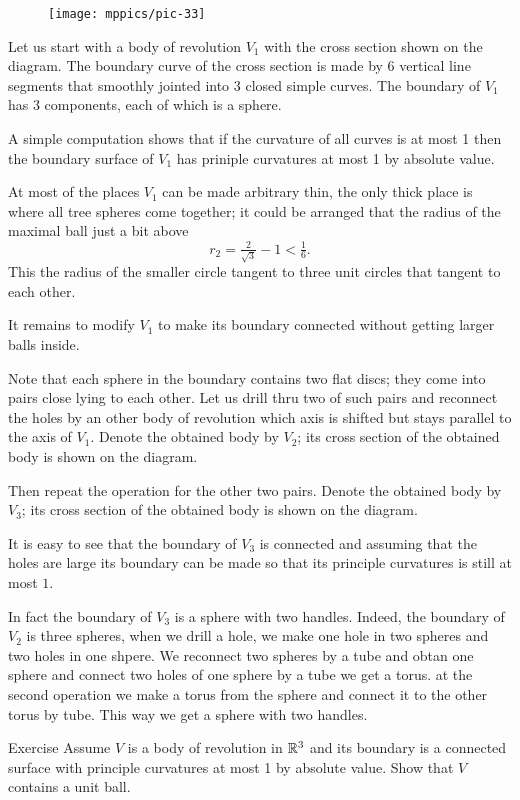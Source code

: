 \begin{figure}%
\centering
\texttt{[image: mppics/pic-33]}
\vskip0mm
\end{figure}

Let us start with a body of revolution $V_1$ with the cross section shown on the diagram.
The boundary curve of the cross section is made by 6 vertical line segments that smoothly jointed into 3 closed simple curves. 
The boundary of $V_1$ has 3 components, each of which is a sphere.

A simple computation shows that if the curvature of all curves is at most 1 then the boundary surface of $V_1$ has priniple curvatures at most 1 by absolute value.

At most of the places $V_1$ can be made arbitrary thin,
the only thick place is where all tree spheres come together;
it could be arranged that the radius of the maximal ball just a bit above 
\[r_2=\tfrac2{\sqrt{3}}-1< \tfrac16.\]
This the radius of the smaller circle tangent to three unit circles that tangent to each other.


It remains to modify $V_1$ to make its boundary connected without  getting larger balls inside.

Note that each sphere in the boundary contains two flat discs;
they come into pairs close lying to each other. 
Let us drill thru two of such pairs and reconnect the holes by an other body of revolution which axis is shifted but stays parallel to the axis of $V_1$.
Denote the obtained body by $V_2$; its cross section of the obtained body is shown on the diagram. 

Then repeat the operation for the other two pairs.
Denote the obtained body by $V_3$; its cross section of the obtained body is shown on the diagram.

It is easy to see that the boundary of $V_3$ is connected
and assuming that the holes are large its boundary can be made so that its principle curvatures is still at most $1$.
\qeds

In fact the boundary of $V_3$ is a sphere with two handles.
Indeed, the boundary of $V_2$ is three spheres,
when we drill a hole, we make one hole in two spheres and two holes in one shpere.
We reconnect two spheres by a tube and obtan one sphere
and connect two holes of one sphere by a tube we get a torus.
at the second operation we make a torus from the sphere and connect it to the other torus by tube.
This way we get a sphere with two handles.

\begin{thm}{Exercise}
Assume $V$ is a body of revolution in $\mathbb{R}^3$ and its boundary is a connected surface with principle curvatures at most 1 by absolute value.
Show that $V$ contains a unit ball.
\end{thm}

